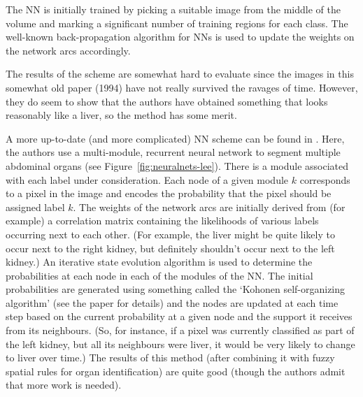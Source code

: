 The NN is initially trained by picking a suitable image from the middle of the volume and marking a significant number of training regions for each class. The well-known back-propagation algorithm for NNs is used to update the weights on the network arcs accordingly.

The results of the scheme are somewhat hard to evaluate since the images in this somewhat old paper (1994) have not really survived the ravages of time. However, they do seem to show that the authors have obtained something that looks reasonably like a liver, so the method has some merit.


\clearpage

A more up-to-date (and more complicated) NN scheme can be found in \cite{lee03}. Here, the authors use a multi-module, recurrent neural network to segment multiple abdominal organs (see Figure~\ref{fig:neuralnets-lee}). There is a module associated with each label under consideration. Each node of a given module $k$ corresponds to a pixel in the image and encodes the probability that the pixel should be assigned label $k$. The weights of the network arcs are initially derived from (for example) a correlation matrix containing the likelihoods of various labels occurring next to each other. (For example, the liver might be quite likely to occur next to the right kidney, but definitely shouldn't occur next to the left kidney.) An iterative state evolution algorithm is used to determine the probabilities at each node in each of the modules of the NN. The initial probabilities are generated using something called the `Kohonen self-organizing algorithm' (see the paper for details) and the nodes are updated at each time step based on the current probability at a given node and the support it receives from its neighbours. (So, for instance, if a pixel was currently classified as part of the left kidney, but all its neighbours were liver, it would be very likely to change to liver over time.) The results of this method (after combining it with fuzzy spatial rules for organ identification) are quite good (though the authors admit that more work is needed).


